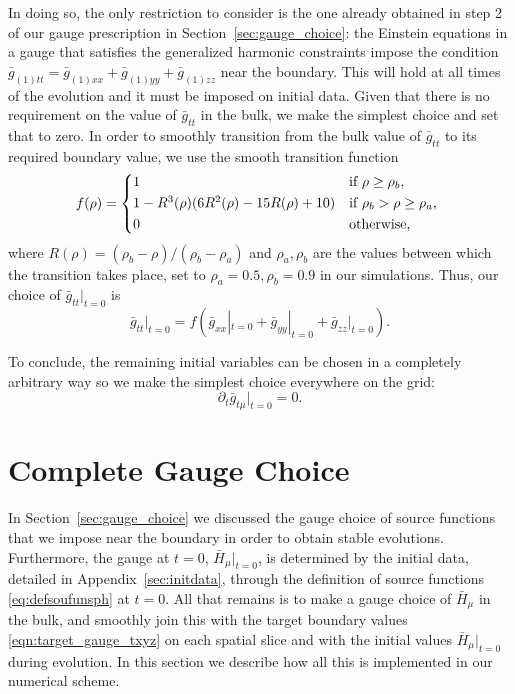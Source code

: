 \documentclass[a4paper,11pt]{article}
\numberwithin{equation}{section}
\begin{document}
In doing so, the only restriction to consider is the one already obtained in step 2 of our gauge prescription in Section~\ref{sec:gauge_choice}: the Einstein equations in a gauge that satisfies the generalized harmonic constraints impose the condition $\bar{g}_{(1)tt}=\bar{g}_{(1)xx}+\bar{g}_{(1)yy}+\bar{g}_{(1)zz}$ near the boundary. This will hold at all times of the evolution and it must be imposed on initial data. Given that there is no requirement on the value of $\bar{g}_{tt}$ in the bulk, we make the simplest choice and set that to zero. In order to smoothly transition from the bulk value of $\bar{g}_{tt}$ to its required boundary value, we use the smooth transition function
  \begin{equation}
  \label{eq:transfunc}
    f(\rho) =
    \begin{cases*}
      1 & if $\rho\geq \rho_{b}$, \\
      1-R^3(\rho)(6 R^2(\rho)-15 R(\rho)+10) & if $\rho_{b} > \rho\geq\rho_{a}$, \\
      0        & otherwise,
    \end{cases*}
  \end{equation}
where $R(\rho)=(\rho_{b}-\rho)/(\rho_{b}-\rho_{a})$ and $\rho_{a},\rho_{b}$ are the values between which the transition takes place, set to $\rho_{a}=0.5,\rho_{b}=0.9$ in our simulations.
Thus, our choice of $\bar{g}_{tt}|_{t=0}$ is
\begin{equation}
\bar{g}_{tt}\big|_{t=0}=f(\bar{g}_{xx}|_{t=0}+\bar{g}_{yy}|_{t=0}+\bar{g}_{zz}|_{t=0}).
\end{equation}

To conclude, the remaining initial variables can be chosen in a completely arbitrary way so we make the simplest choice everywhere on the grid:
\begin{equation}
\partial_t\bar{g}_{t \mu}|_{t=0}=0.
\end{equation}

\section{Complete Gauge Choice}
\label{sec:GCbulk}

In Section~\ref{sec:gauge_choice} we discussed the gauge choice of source functions that we impose near the boundary in order to obtain stable evolutions. Furthermore, the gauge at $t=0$, $\bar{H}_{\mu}|_{t=0}$, is determined by the initial data, detailed in Appendix~\ref{sec:initdata}, through the definition of source functions \eqref{eq:defsoufunsph} at $t=0$. All that remains is to make a gauge choice of $\bar{H}_\mu$ in the bulk, and smoothly join this with the target boundary values \eqref{eqn:target_gauge_txyz} on each spatial slice and with the initial values $\bar{H}_{\mu}|_{t=0}$ during evolution. In this section we describe how all this is implemented in our numerical scheme.
\end{document}
